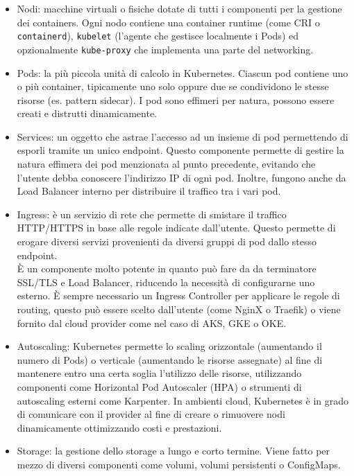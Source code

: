 \documentclass[12pt,a4paper,openright,twoside]{book}
\begin{document}
\begin{itemize}
    \item {
        Nodi: macchine virtuali o fisiche dotate di tutti i componenti per la gestione dei containers. Ogni nodo contiene una container runtime (come CRI o \texttt{containerd}), \texttt{kubelet} (l'agente che gestisce localmente i Pods) ed opzionalmente \texttt{kube-proxy} che implementa una parte del networking.
    }
    \item {
        Pods: la più piccola unità di calcolo in Kubernetes. Ciascun pod contiene uno o più container, tipicamente uno solo oppure due se condividono le stesse risorse (es. pattern sidecar).
        I pod sono effimeri per natura, possono essere creati e distrutti dinamicamente.
    }
    \item {
        Services: un oggetto che astrae l'accesso ad un insieme di pod permettendo di esporli tramite un unico endpoint.
        Questo componente permette di gestire la natura effimera dei pod menzionata al punto precedente, evitando che l'utente debba conoscere l'indirizzo IP di ogni pod.
        Inoltre, fungono anche da Load Balancer interno per distribuire il traffico tra i vari pod.
    }
    \item {
        Ingress: è un servizio di rete che permette di smistare il traffico HTTP/HTTPS in base alle regole indicate dall'utente. Questo permette di erogare diversi servizi provenienti da diversi gruppi di pod dallo stesso endpoint.\\
        È un componente molto potente in quanto può fare da da terminatore SSL/TLS e Load Balancer, riducendo la necessità di configurarne uno esterno.
        È sempre necessario un Ingress Controller per applicare le regole di routing, questo può essere scelto dall'utente (come NginX o Traefik) o viene fornito dal cloud provider come nel caso di AKS, GKE o OKE. 
    }
    \item {
        Autoscaling: Kubernetes permette lo scaling orizzontale (aumentando il numero di Pods) o verticale (aumentando le risorse assegnate) al fine di mantenere entro una certa soglia l'utilizzo delle risorse,
        utilizzando componenti come Horizontal Pod Autoscaler (HPA) o strumenti di autoscaling esterni come Karpenter. 
        In ambienti cloud, Kubernetes è in grado di comunicare con il provider al fine di creare o rimuovere nodi dinamicamente ottimizzando costi e prestazioni.
    }
    \item {
        Storage: la gestione dello storage a lungo e corto termine. Viene fatto per mezzo di diversi componenti come volumi, volumi persistenti o ConfigMaps.
    }
\end{itemize}
\end{document}

